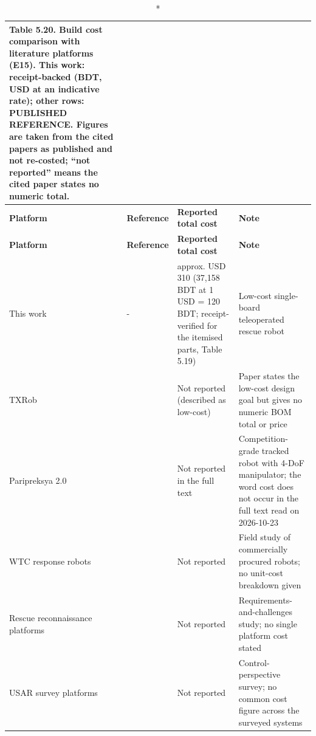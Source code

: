 \begin{center}
\begin{longtable}{|p{3cm}|l|p{4cm}|p{5cm}|}
\caption*{Table 5.20. Build cost comparison with literature platforms (E15). This work: receipt-backed (BDT, USD at an indicative rate); other rows: PUBLISHED REFERENCE. Figures are taken from the cited papers as published and not re-costed; ``not reported'' means the cited paper states no numeric total.}
\addcontentsline{lot}{table}{\protect\numberline{5.20}Build cost comparison with literature platforms (E15). This work: receipt-backed (BDT, USD at an indicative rate); other rows: PUBLISHED REFERENCE. Figures are taken from the cited papers as published and not re-costed; ``not reported'' means the cited paper states no numeric total.}
\\
\hline
\textbf{Platform} & \textbf{Reference} & \textbf{Reported total cost} & \textbf{Note} \\
\hline
\endfirsthead
\hline
\textbf{Platform} & \textbf{Reference} & \textbf{Reported total cost} & \textbf{Note} \\
\hline
\endhead
This work & - & approx. USD 310 (37,158 BDT at 1 USD = 120 BDT; receipt-verified for the itemised parts, Table 5.19) & Low-cost single-board teleoperated rescue robot \\
\hline
TXRob & \cite{verano2022} & Not reported (described as low-cost) & Paper states the low-cost design goal but gives no numeric BOM total or price \\
\hline
Paripreksya 2.0 & \cite{megalingam2022} & Not reported in the full text & Competition-grade tracked robot with 4-DoF manipulator; the word cost does not occur in the full text read on 2026-10-23 \\
\hline
WTC response robots & \cite{casper2003} & Not reported & Field study of commercially procured robots; no unit-cost breakdown given \\
\hline
Rescue reconnaissance platforms & \cite{daun2023} & Not reported & Requirements-and-challenges study; no single platform cost stated \\
\hline
USAR survey platforms & \cite{liu2013} & Not reported & Control-perspective survey; no common cost figure across the surveyed systems \\
\hline
\end{longtable}
\end{center}

